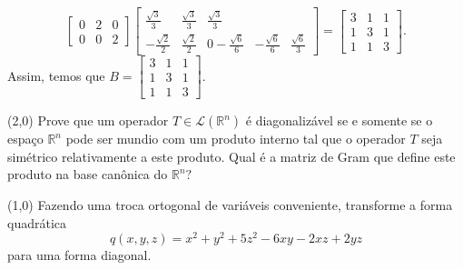 \documentclass[11pt,a4paper]{article}
\begin{document}
{\[\begin{bmatrix}
0 & 2 & 0 \\
0 & 0 & 2
\end{bmatrix}\begin{bmatrix}
 \frac{\sqrt{3}}{3} &  \frac{\sqrt{3}}{3}  &  \frac{\sqrt{3}}{3} \\
- \frac{\sqrt{2}}{2} &\frac{\sqrt{2}}{2} & 0 
- \frac{\sqrt{6}}{6} & - \frac{\sqrt{6}}{6}&  \frac{\sqrt{6}}{3}  
\end{bmatrix} = \begin{bmatrix}
3 & 1 & 1 \\
1 & 3 & 1 \\
1 & 1 & 3
\end{bmatrix}.
\]
Assim, temos que $B = \begin{bmatrix}
3 & 1 & 1 \\
1 & 3 & 1 \\
1 & 1 & 3
\end{bmatrix}.$
}
\begin{exercicio}
(2,0) Prove que um operador $T \in \mathcal{L}(\mathbb{R}^n)$ é diagonalizável se e somente se o espaço $\mathbb{R}^n$ pode ser mundio com um produto interno tal que o operador $T$ seja simétrico relativamente a este produto. Qual é a matriz de Gram que define este produto na base canônica do $\mathbb{R}^n?$
\end{exercicio}
\solucao{}
\begin{exercicio}
(1,0) Fazendo uma troca ortogonal de variáveis conveniente, transforme a forma quadrática
\[
q(x,y,z) = x^2 + y^2 +5z^2 - 6xy - 2xz + 2yz
\]
para uma forma diagonal.
\end{exercicio}
\end{document}
